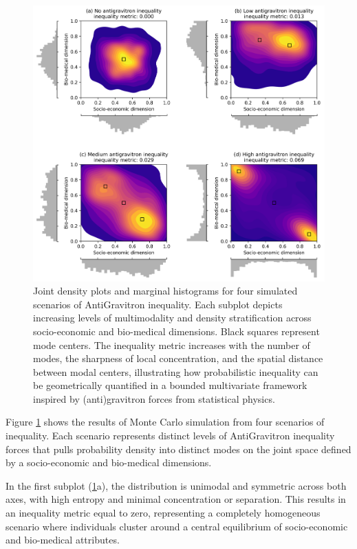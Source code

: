 \documentclass[11pt]{article}
\begin{document}
\begin{figure}[ht!]
    \centering
    \includegraphics[width=\linewidth]{figures/fig_MCsim.png}
    \caption{Joint density plots and marginal histograms for four simulated scenarios of AntiGravitron inequality. Each subplot depicts increasing levels of multimodality and density stratification across socio-economic and bio-medical dimensions. Black squares represent mode centers. The inequality metric increases with the number of modes, the sharpness of local concentration, and the spatial distance between modal centers, illustrating how probabilistic inequality can be geometrically quantified in a bounded multivariate framework inspired by (anti)gravitron forces from statistical physics.}
    \label{fig:MCsim}
\end{figure}

Figure \ref{fig:MCsim} shows the results of Monte Carlo simulation from four scenarios of inequality. Each scenario represents distinct levels of AntiGravitron inequality forces that pulls probability density into distinct modes on the joint space defined by a socio-economic and bio-medical dimensions.

In the first subplot (\ref{fig:MCsim}a), the distribution is unimodal and symmetric across both axes, with high entropy and minimal concentration or separation. This results in an inequality metric equal to zero, representing a completely homogeneous scenario where individuals cluster around a central equilibrium of socio-economic and bio-medical attributes.
\end{document}
